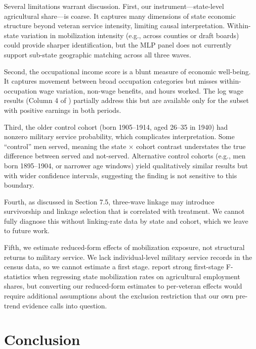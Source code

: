 \documentclass[12pt]{article}
\begin{document}
Several limitations warrant discussion. First, our instrument---state-level agricultural share---is coarse. It captures many dimensions of state economic structure beyond veteran service intensity, limiting causal interpretation. Within-state variation in mobilization intensity (e.g., across counties or draft boards) could provide sharper identification, but the MLP panel does not currently support sub-state geographic matching across all three waves.

Second, the occupational income score is a blunt measure of economic well-being. It captures movement between broad occupation categories but misses within-occupation wage variation, non-wage benefits, and hours worked. The log wage results (Column 4 of ) partially address this but are available only for the subset with positive earnings in both periods.

Third, the older control cohort (born 1905--1914, aged 26--35 in 1940) had nonzero military service probability, which complicates interpretation. Some ``control'' men served, meaning the state $\times$ cohort contrast understates the true difference between served and not-served. Alternative control cohorts (e.g., men born 1895--1904, or narrower age windows) yield qualitatively similar results but with wider confidence intervals, suggesting the finding is not sensitive to this boundary.

Fourth, as discussed in Section 7.5, three-wave linkage may introduce survivorship and linkage selection that is correlated with treatment. We cannot fully diagnose this without linking-rate data by state and cohort, which we leave to future work.

Fifth, we estimate reduced-form effects of mobilization exposure, not structural returns to military service. We lack individual-level military service records in the census data, so we cannot estimate a first stage. \citet{acemoglu2004} report strong first-stage F-statistics when regressing state mobilization rates on agricultural employment shares, but converting our reduced-form estimates to per-veteran effects would require additional assumptions about the exclusion restriction that our own pre-trend evidence calls into question.

\section{Conclusion}
\end{document}
